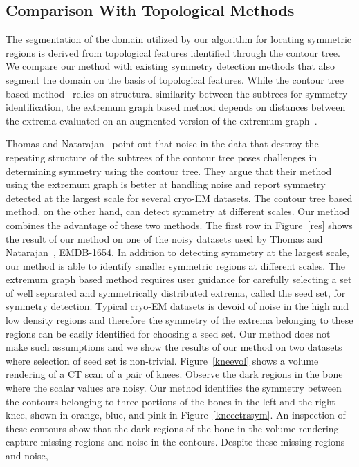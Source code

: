\documentclass[review,journal]{vgtc}         %
\begin{document}
\subsection{Comparison With Topological Methods}
The segmentation of the domain utilized by our algorithm for locating symmetric regions is
derived from topological features identified through the contour tree. We compare our
method with existing symmetry detection methods that also segment the domain on the
basis of topological features. While the contour tree based method~\cite{ThomN11} relies 
on structural similarity between the subtrees for symmetry identification, the extremum graph
based method depends on distances between the extrema evaluated on an augmented version of the extremum
graph~\cite{ThomN13}. 

Thomas and Natarajan~\cite{ThomN13} point out that noise in the data
that destroy the repeating structure of the subtrees of the contour tree poses challenges in
determining symmetry using the contour tree. They argue that their method using the extremum graph
is better at handling noise and report symmetry detected at the largest scale for several 
cryo-EM datasets. The contour tree based method, on the other hand, can detect symmetry at different scales.
Our method combines the advantage of these two methods. The first row in Figure~\ref{res} shows the result of our
method on one of the noisy datasets used by Thomas and Natarajan~\cite{ThomN13}, EMDB-1654. In addition 
to detecting symmetry at the largest scale, our method is able to identify smaller symmetric
regions at different scales. The extremum graph based method requires user guidance for carefully
selecting a set of well separated and symmetrically distributed extrema, called the seed set, 
for symmetry detection. Typical cryo-EM datasets is devoid of noise in the high and low density regions and therefore
the symmetry of the extrema belonging to these regions can be easily identified for choosing
a seed set. Our method does not make such assumptions and we show the results of our method 
on two datasets where selection of seed
set is non-trivial. Figure~\ref{kneevol} shows a volume rendering of a CT scan of a pair of knees. Observe the
dark regions in the bone where the scalar values are noisy. Our method identifies
the symmetry between the contours belonging to three portions of the bones in the left and the right knee, shown
in orange, blue, and pink in Figure~\ref{kneectrssym}. An inspection of these contours show that the dark regions of the bone in 
the volume rendering capture missing regions and noise in the contours. Despite these missing regions and noise,
\end{document}
